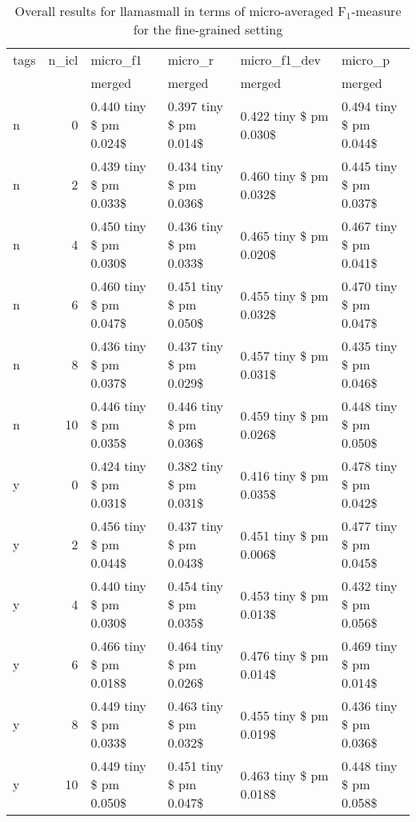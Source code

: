 \begin{table}
\caption{Overall results for llamasmall in terms of micro-averaged F$_1$-measure for the fine-grained setting}
\label{tab:coarse-overall}
\begin{tabular}{lrllll}
\toprule
tags & n\_icl & micro\_f1 & micro\_r & micro\_f1\_dev & micro\_p \\
 &  & merged & merged & merged & merged \\
\midrule
n & 0 & 0.440 tiny \$ pm 0.024\$ & 0.397 tiny \$ pm 0.014\$ & 0.422 tiny \$ pm 0.030\$ & 0.494 tiny \$ pm 0.044\$ \\
n & 2 & 0.439 tiny \$ pm 0.033\$ & 0.434 tiny \$ pm 0.036\$ & 0.460 tiny \$ pm 0.032\$ & 0.445 tiny \$ pm 0.037\$ \\
n & 4 & 0.450 tiny \$ pm 0.030\$ & 0.436 tiny \$ pm 0.033\$ & 0.465 tiny \$ pm 0.020\$ & 0.467 tiny \$ pm 0.041\$ \\
n & 6 & 0.460 tiny \$ pm 0.047\$ & 0.451 tiny \$ pm 0.050\$ & 0.455 tiny \$ pm 0.032\$ & 0.470 tiny \$ pm 0.047\$ \\
n & 8 & 0.436 tiny \$ pm 0.037\$ & 0.437 tiny \$ pm 0.029\$ & 0.457 tiny \$ pm 0.031\$ & 0.435 tiny \$ pm 0.046\$ \\
n & 10 & 0.446 tiny \$ pm 0.035\$ & 0.446 tiny \$ pm 0.036\$ & 0.459 tiny \$ pm 0.026\$ & 0.448 tiny \$ pm 0.050\$ \\
y & 0 & 0.424 tiny \$ pm 0.031\$ & 0.382 tiny \$ pm 0.031\$ & 0.416 tiny \$ pm 0.035\$ & 0.478 tiny \$ pm 0.042\$ \\
y & 2 & 0.456 tiny \$ pm 0.044\$ & 0.437 tiny \$ pm 0.043\$ & 0.451 tiny \$ pm 0.006\$ & 0.477 tiny \$ pm 0.045\$ \\
y & 4 & 0.440 tiny \$ pm 0.030\$ & 0.454 tiny \$ pm 0.035\$ & 0.453 tiny \$ pm 0.013\$ & 0.432 tiny \$ pm 0.056\$ \\
y & 6 & 0.466 tiny \$ pm 0.018\$ & 0.464 tiny \$ pm 0.026\$ & 0.476 tiny \$ pm 0.014\$ & 0.469 tiny \$ pm 0.014\$ \\
y & 8 & 0.449 tiny \$ pm 0.033\$ & 0.463 tiny \$ pm 0.032\$ & 0.455 tiny \$ pm 0.019\$ & 0.436 tiny \$ pm 0.036\$ \\
y & 10 & 0.449 tiny \$ pm 0.050\$ & 0.451 tiny \$ pm 0.047\$ & 0.463 tiny \$ pm 0.018\$ & 0.448 tiny \$ pm 0.058\$ \\
\bottomrule
\end{tabular}
\end{table}
